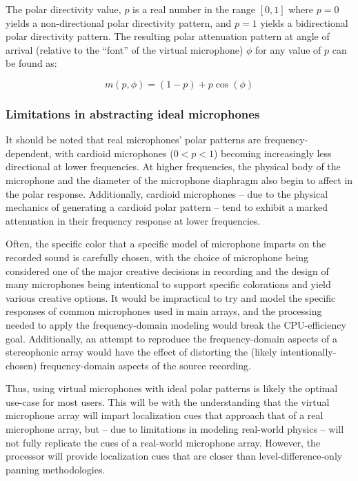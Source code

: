 The polar directivity value, $p$ is a real number in the range $[0,1]$ where $p=0$ yields a non-directional polar directivity pattern, and $p=1$ yields a bidirectional polar directivity pattern. The resulting polar attenuation pattern at angle of arrival (relative to the ``font'' of the virtual microphone) $\phi$ for any value of $p$ can be found as:

\begin{equation}\label{polarPatternPlot}
m(p,\phi) = (1-p) + p\cos(\phi)
\end{equation}

\subsubsection{Limitations in abstracting ideal microphones}

It should be noted that real microphones' polar patterns are frequency-dependent, with cardioid microphones ($0 < p < 1$) becoming increasingly less directional at lower frequencies. At higher frequencies, the physical body of the microphone and the diameter of the microphone diaphragm also begin to affect in the polar response. Additionally, cardioid microphones -- due to the physical mechanics of generating a cardioid polar pattern -- tend to exhibit a marked attenuation in their frequency response at lower frequencies.

Often, the specific color that a specific model of microphone imparts on the recorded sound is carefully chosen, with the choice of microphone being considered one of the major creative decisions in recording and the design of many microphones being intentional to support specific colorations and yield various creative options. It would be impractical to try and model the specific responses of common microphones used in main arrays, and the processing needed to apply the frequency-domain modeling would break the CPU-efficiency goal. Additionally, an attempt to reproduce the frequency-domain aspects of a stereophonic array would have the effect of distorting the (likely intentionally-chosen) frequency-domain aspects of the source recording.

Thus, using virtual microphones with ideal polar patterns is likely the optimal use-case for most users. This will be with the understanding that the virtual microphone array will impart localization cues that approach that of a real microphone array, but -- due to limitations in modeling real-world physics -- will not fully replicate the cues of a real-world microphone array. However, the processor will provide localization cues that are closer than level-difference-only panning methodologies.

